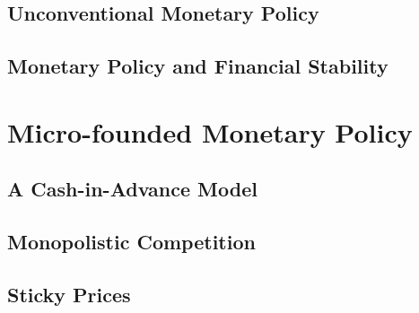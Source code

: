 \documentclass[11pt,a4paper,oneside]{book}
\begin{document}




\chapter{Unconventional Monetary Policy}


\chapter{Monetary Policy and Financial Stability}


\part{Micro-founded Monetary Policy}
\chapter{A Cash-in-Advance Model}


\chapter{Monopolistic Competition}


\chapter{Sticky Prices}
\end{document}
